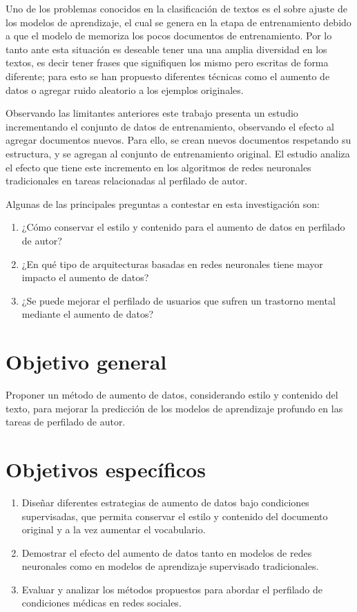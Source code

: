 Uno de los problemas conocidos en la clasificación de textos es el sobre ajuste de los modelos de aprendizaje, el cual se genera en la etapa de entrenamiento debido a que el modelo de  memoriza los pocos documentos de entrenamiento. Por lo tanto ante esta situación es deseable tener una una amplia diversidad en los textos, es decir tener frases que signifiquen los mismo pero escritas de forma diferente; para esto se han propuesto diferentes técnicas como el aumento de datos o agregar ruido aleatorio a los ejemplos originales.

Observando las limitantes anteriores este trabajo presenta un estudio incrementando el conjunto de datos de entrenamiento, observando el efecto al agregar documentos nuevos. Para ello, se crean nuevos documentos respetando su estructura, y se agregan al  conjunto de entrenamiento original. El estudio analiza el efecto que tiene este incremento en los algoritmos de redes neuronales tradicionales en tareas relacionadas al perfilado de autor. 

Algunas de las principales preguntas a contestar en esta investigación son:

\begin{enumerate}
    \item {¿Cómo conservar el estilo y contenido para el aumento de datos en perfilado de autor?}
    \item ¿En qué tipo de arquitecturas basadas en redes neuronales tiene mayor impacto el aumento de datos?
    \item ¿Se puede mejorar el perfilado de usuarios que sufren un trastorno mental mediante el aumento de datos?
\end{enumerate}


\section{Objetivo general}

Proponer un método de aumento de datos, considerando estilo y contenido del texto, para mejorar la predicción de los modelos de aprendizaje profundo en las tareas de perfilado de autor.


\section{Objetivos específicos}
\begin{enumerate}
    \item Diseñar diferentes estrategias de aumento de datos bajo condiciones supervisadas, que permita conservar el estilo y contenido del documento original y a la vez aumentar el vocabulario.
    \item Demostrar el efecto del aumento de datos tanto en modelos de redes neuronales como en modelos de aprendizaje supervisado tradicionales.
    \item Evaluar y analizar los métodos propuestos para abordar el perfilado de condiciones médicas en redes sociales.
 
\end{enumerate}

